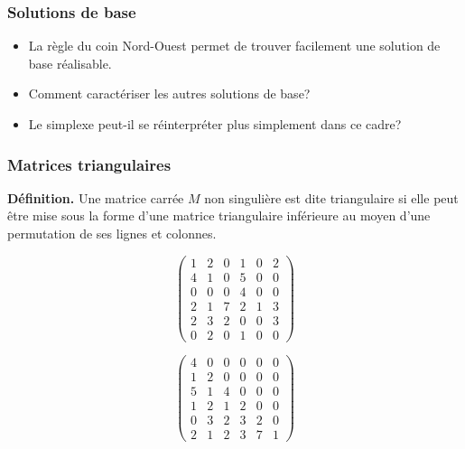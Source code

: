 \documentclass[usepdftitle=false]{beamer}
\begin{document}
\begin{frame}
\frametitle{Solutions de base}

\begin{itemize}
\item 
La règle du coin Nord-Ouest permet de trouver facilement une solution de base réalisable.
\item
Comment caractériser les autres solutions de base?
\item
Le simplexe peut-il se réinterpréter plus simplement dans ce cadre?
\end{itemize}

\end{frame}

\begin{frame}
\frametitle{Matrices triangulaires}

{\bf Définition.}
Une matrice carrée $M$ non singulière est dite triangulaire si elle
peut être mise sous la forme d'une matrice triangulaire inférieure au moyen d'une permutation de ses lignes et colonnes.

\mbox{}

\begin{center}
\begin{minipage}{.4\linewidth}
\[
\begin{pmatrix}
1 & 2 & 0 & 1 & 0 & 2 \\
4 & 1 & 0 & 5 & 0 & 0 \\
0 & 0 & 0 & 4 & 0 & 0 \\
2 & 1 & 7 & 2 & 1 & 3 \\
2 & 3 & 2 & 0 & 0 & 3 \\
0 & 2 & 0 & 1 & 0 & 0
\end{pmatrix}
\]
\end{minipage}
\begin{minipage}{.4\linewidth}
\[
\begin{pmatrix}
4 & 0 & 0 & 0 & 0 & 0 \\
1 & 2 & 0 & 0 & 0 & 0 \\
5 & 1 & 4 & 0 & 0 & 0 \\
1 & 2 & 1 & 2 & 0 & 0 \\
0 & 3 & 2 & 3 & 2 & 0 \\
2 & 1 & 2 & 3 & 7 & 1
\end{pmatrix}
\]
\end{minipage}
\end{center}

\end{frame}
\end{document}
